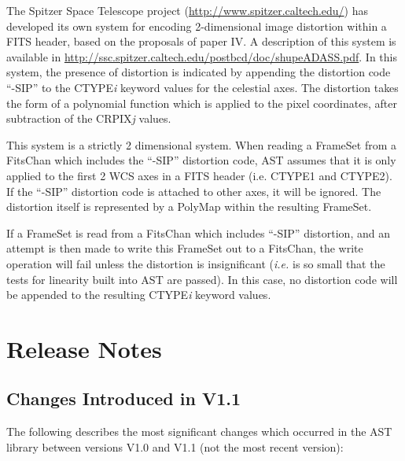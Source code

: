 \documentclass[twoside,11pt]{starlink}
\begin{document}
The Spitzer Space Telescope project
(\url{http://www.spitzer.caltech.edu/})
has developed its own system for encoding 2-dimensional image distortion
within a FITS header, based on the proposals of paper IV. A description
of this system is available in
\url{http://ssc.spitzer.caltech.edu/postbcd/doc/shupeADASS.pdf}. In this
system, the presence of distortion is indicated by appending the
distortion code ``-SIP'' to the CTYPE\emph{i} keyword values for the
celestial axes. The distortion takes the form of a polynomial function
which is applied to the pixel coordinates, after subtraction of the
CRPIX\emph{j} values.

This system is a strictly 2 dimensional system. When reading a
FrameSet from a FitsChan which
includes the ``-SIP'' distortion code, AST assumes that it
is only applied to the first 2 WCS axes in a FITS header (i.e.
CTYPE1 and CTYPE2). If the ``-SIP'' distortion code is attached to other
axes, it will be ignored. The distortion itself is represented by a
PolyMap within the resulting FrameSet.

If a FrameSet is read from a FitsChan which includes ``-SIP''
distortion, and an attempt is then made to write this FrameSet out to a
FitsChan, the write operation will fail unless the distortion is
insignificant (\emph{i.e.} is so small that the tests for linearity built
into AST are passed). In this case, no distortion code will be appended to
the resulting CTYPE\emph{i} keyword values.

\newpage
\section{\label{ss:changes}Release Notes}

\subsection{Changes Introduced in V1.1}

The following describes the most significant changes which occurred in
the AST library between versions V1.0 and V1.1 (not the most recent
version):
\end{document}
